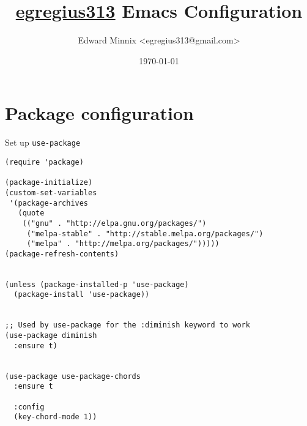 \documentclass[11pt]{article}
\author{Edward Minnix <egregius313@gmail.com>}
\date{\today}
\title{\href{https://github.com/egregius313/dotfiles}{egregius313} Emacs Configuration}
\begin{document}
\maketitle
\tableofcontents


\section{Package configuration}
\label{sec:org8cba573}

Set up \texttt{\texttt{use-package}}

\begin{verbatim}
(require 'package)

(package-initialize)
(custom-set-variables
 '(package-archives
   (quote
	(("gnu" . "http://elpa.gnu.org/packages/")
	 ("melpa-stable" . "http://stable.melpa.org/packages/")
	 ("melpa" . "http://melpa.org/packages/")))))  
(package-refresh-contents)


(unless (package-installed-p 'use-package)
  (package-install 'use-package))


;; Used by use-package for the :diminish keyword to work
(use-package diminish
  :ensure t)


(use-package use-package-chords
  :ensure t

  :config
  (key-chord-mode 1))
\end{verbatim}
\end{document}
